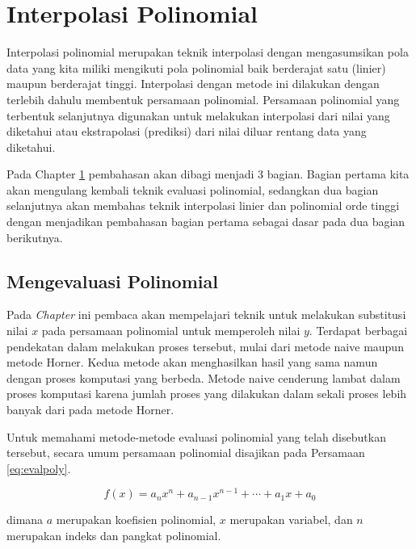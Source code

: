 \documentclass[]{book}
\theoremstyle{definition}
\theoremstyle{definition}
\theoremstyle{definition}
\theoremstyle{remark}
\begin{document}
\hypertarget{poliinterpolation}{%
\section{Interpolasi Polinomial}\label{poliinterpolation}}

Interpolasi polinomial merupakan teknik interpolasi dengan mengasumsikan pola data yang kita miliki mengikuti pola polinomial baik berderajat satu (linier) maupun berderajat tinggi. Interpolasi dengan metode ini dilakukan dengan terlebih dahulu membentuk persamaan polinomial. Persamaan polinomial yang terbentuk selanjutnya digunakan untuk melakukan interpolasi dari nilai yang diketahui atau ekstrapolasi (prediksi) dari nilai diluar rentang data yang diketahui.

Pada Chapter \ref{poliinterpolation} pembahasan akan dibagi menjadi 3 bagian. Bagian pertama kita akan mengulang kembali teknik evaluasi polinomial, sedangkan dua bagian selanjutnya akan membahas teknik interpolasi linier dan polinomial orde tinggi dengan menjadikan pembahasan bagian pertama sebagai dasar pada dua bagian berikutnya.

\hypertarget{mengevaluasi-polinomial}{%
\subsection{Mengevaluasi Polinomial}\label{mengevaluasi-polinomial}}

Pada \emph{Chapter} ini pembaca akan mempelajari teknik untuk melakukan substitusi nilai \(x\) pada persamaan polinomial untuk memperoleh nilai \(y\). Terdapat berbagai pendekatan dalam melakukan proses tersebut, mulai dari metode naive maupun metode Horner. Kedua metode akan menghasilkan hasil yang sama namun dengan proses komputasi yang berbeda. Metode naive cenderung lambat dalam proses komputasi karena jumlah proses yang dilakukan dalam sekali proses lebih banyak dari pada metode Horner.

Untuk memahami metode-metode evaluasi polinomial yang telah disebutkan tersebut, secara umum persamaan polinomial disajikan pada Persamaan \eqref{eq:evalpoly}.

\begin{equation}
f\left(x\right)=a_nx^n+a_{n-1}x^{n-1}+\cdots+a_1x+a_0
  \label{eq:evalpoly}
\end{equation}

dimana \(a\) merupakan koefisien polinomial, \(x\) merupakan variabel, dan \(n\) merupakan indeks dan pangkat polinomial.
\end{document}
